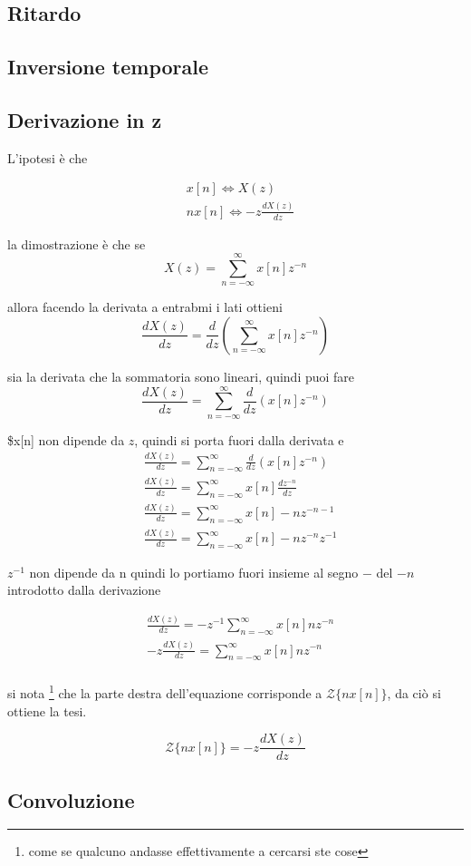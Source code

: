 \documentclass[11pt]{article}
\begin{document}
\subsection{Ritardo}
\label{sec:orgfb79288}

\subsection{Inversione temporale}
\label{sec:org261b1d8}

\subsection{Derivazione in z}
\label{sec:org3f7cda7}

L'ipotesi è che

\begin{align*}
&x[n] \iff X(z) \\
&n x[n] \iff -z \frac{dX(z)}{dz}
\end{align*}

la dimostrazione è che se
\[
X(z) = \sum_{n=-\infty}^{\infty} x[n] z^{-n}
\]

allora facendo la derivata a entrabmi i lati ottieni
\[
\frac{dX(z)}{dz} = \frac{d}{dz}(\sum_{n=-\infty}^{\infty} x[n] z^{-n})
\]

sia la derivata che la sommatoria sono lineari, quindi puoi fare
\[
\frac{dX(z)}{dz} = \sum_{n=-\infty}^{\infty} \frac{d}{dz}(x[n] z^{-n})
\]

\$x[n] non dipende da \(z\), quindi si porta fuori dalla derivata e
\begin{align*}
&\frac{dX(z)}{dz} = \sum_{n=-\infty}^{\infty} \frac{d}{dz}(x[n] z^{-n}) \\
&\frac{dX(z)}{dz} = \sum_{n=-\infty}^{\infty} x[n] \frac{dz^{-n}}{dz} \\
&\frac{dX(z)}{dz} = \sum_{n=-\infty}^{\infty} x[n] -n z^{-n-1} \\
&\frac{dX(z)}{dz} = \sum_{n=-\infty}^{\infty} x[n] -n z^{-n} z^{-1}
\end{align*}

\(z^{-1}\) non dipende da n quindi lo portiamo fuori insieme al segno
\(-\) del \(-n\) introdotto dalla derivazione

\begin{align*}
&\frac{dX(z)}{dz} = -z^{-1} \sum_{n=-\infty}^{\infty} x[n] n z^{-n} \\
&-z \frac{dX(z)}{dz} = \sum_{n=-\infty}^{\infty} x[n] n z^{-n} \\
\end{align*}

si nota \footnote{come se qualcuno andasse effettivamente a cercarsi ste
cose} che la parte destra dell'equazione corrisponde a \(\mathcal{Z}\{n
x[n]\}\), da ciò si ottiene la tesi.

\[
\mathcal{Z}\{n x[n]\} = -z \frac{dX(z)}{dz}
\]

\subsection{Convoluzione}
\label{sec:org77917d9}
\end{document}

